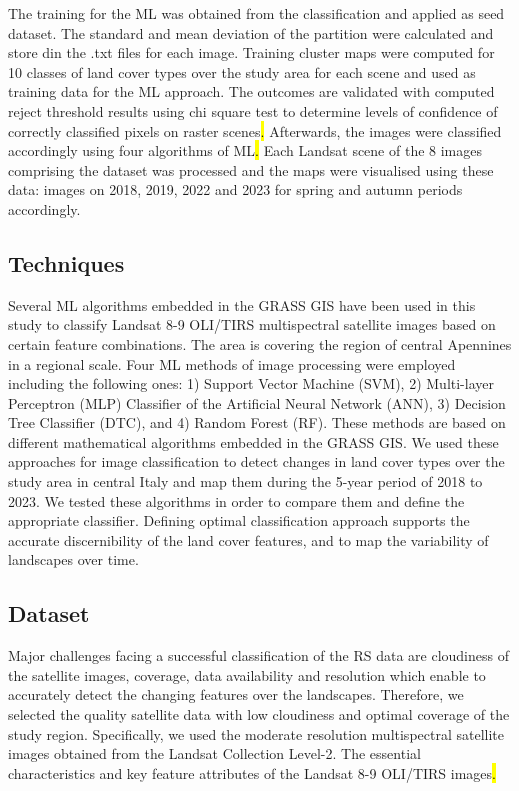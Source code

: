 \documentclass[eprint,
approc,		%
]{actapoly}
\begin{document}
The training for the ML was obtained from the classification and applied as seed dataset. The standard and mean deviation of the partition were calculated and store din the .txt files for each image. Training cluster maps were computed for 10 classes of land cover types over the study area for each scene and used as training data for the ML approach. The outcomes are validated with computed reject threshold results using chi square test to determine levels of confidence of correctly classified pixels on raster scenes\hl{. }Afterwards, the images were classified accordingly using four algorithms of ML\hl{. }Each Landsat scene of the 8 images comprising the dataset was processed and the maps were visualised using these data: images on 2018, 2019, 2022 and 2023 for spring and autumn periods accordingly. 

\subsection{Techniques}

Several ML algorithms embedded in the GRASS GIS have been used in this study to classify Landsat 8-9 OLI/TIRS multispectral satellite images based on certain feature combinations. The area is covering the region of central Apennines in a regional scale. Four ML methods of image processing were employed including the following ones: 1) Support Vector Machine (SVM), 2) Multi-layer Perceptron (MLP) Classifier of the Artificial Neural Network (ANN), 3) Decision Tree Classifier (DTC), and 4) Random Forest (RF). These methods are based on different mathematical algorithms embedded in the GRASS GIS. We used these approaches for image classification to detect changes in land cover types over the study area in central Italy and map them during the 5-year period of 2018 to 2023. We tested these algorithms in order to compare them and define the appropriate classifier. Defining optimal classification approach supports the accurate discernibility of the land cover features, and to map the variability of landscapes over time.

\subsection{Dataset}

Major challenges facing a successful classification of the RS data are cloudiness of the satellite images, coverage, data availability and resolution which enable to accurately detect the changing features over the landscapes. Therefore, we selected the quality satellite data with low cloudiness and optimal coverage of the study region. Specifically, we used the moderate resolution multispectral satellite images obtained from the Landsat Collection Level-2. The essential characteristics and key feature attributes of the Landsat 8-9 OLI/TIRS images\hl{.} 
\end{document}
